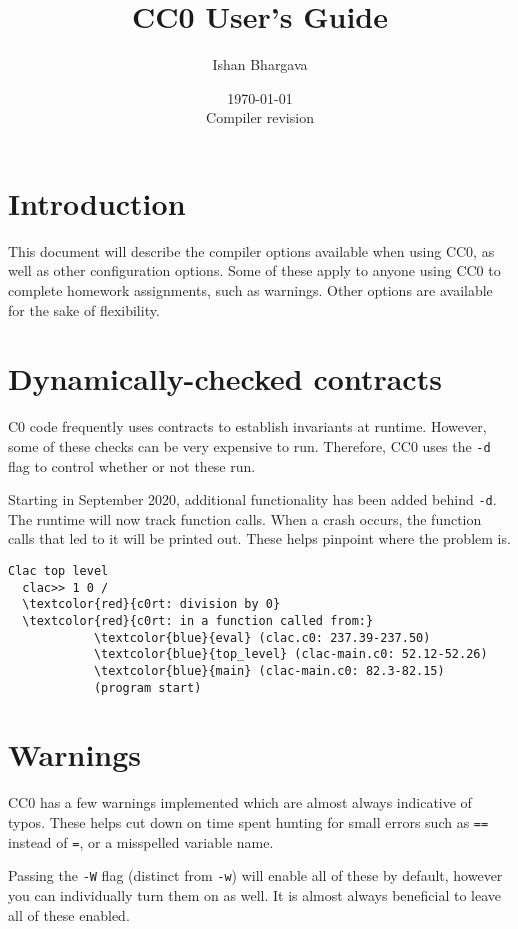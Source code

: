 \documentclass[11pt]{article}
\title{CC0 User's Guide}
\author{Ishan Bhargava}
\date{\today\\Compiler revision \rev}
\begin{document}
\maketitle

\section{Introduction}

This document will describe the compiler options available when using CC0, as well as other configuration options. Some of these apply to anyone using CC0 to complete homework assignments, such as warnings. Other options are available for the sake of flexibility. 

\section{Dynamically-checked contracts}

C0 code frequently uses contracts to establish invariants at runtime. However, some of these checks can be very expensive to run. Therefore, CC0 uses the \texttt{-d} flag to control whether or not these run.

Starting in September 2020, additional functionality has been added behind \texttt{-d}. The runtime will now track function calls. When a crash occurs, the function calls that led to it will be printed out. These helps pinpoint where the problem is.

\begin{Verbatim}[commandchars=\\\{\}]
  Clac top level
  clac>> 1 0 /
  \textcolor{red}{c0rt: division by 0}
  \textcolor{red}{c0rt: in a function called from:}
            \textcolor{blue}{eval} (clac.c0: 237.39-237.50)
            \textcolor{blue}{top_level} (clac-main.c0: 52.12-52.26)
            \textcolor{blue}{main} (clac-main.c0: 82.3-82.15)
            (program start)    
\end{Verbatim}

\section{Warnings}

CC0 has a few warnings implemented which are almost always indicative of typos. These helps cut down on time spent hunting for small errors such as \texttt{==} instead of \texttt{=}, or a misspelled variable name. 

Passing the \texttt{-W} flag (distinct from \texttt{-w}) will enable all of these by default, however you can individually turn them on as well.
It is almost always beneficial to leave all of these enabled.
\end{document}

